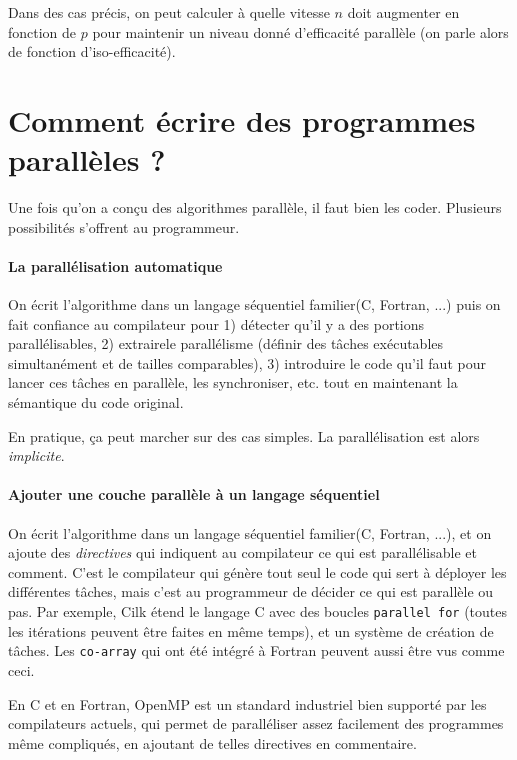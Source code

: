 Dans des cas précis, on peut calculer à quelle vitesse $n$ doit augmenter en
fonction de $p$ pour maintenir un niveau donné d'efficacité parallèle (on parle
alors de \og fonction d'iso-efficacité\fg).

\section{Comment écrire des programmes parallèles ?}

Une fois qu'on a conçu des algorithmes parallèle, il faut bien les
coder. Plusieurs possibilités s'offrent au programmeur.

\paragraph{La parallélisation automatique} On écrit l'algorithme dans un langage
séquentiel \og familier\fg (C, Fortran, ...) puis on fait confiance au
compilateur pour 1) détecter qu'il y a des portions parallélisables, 2) \og
extraire\fg le parallélisme (définir des tâches exécutables simultanément et de
tailles comparables), 3) introduire le code qu'il faut pour lancer ces tâches en
parallèle, les synchroniser, etc. tout en maintenant la sémantique du code
original.

En pratique, ça peut marcher sur des cas simples. La parallélisation est alors
\emph{implicite}.

\paragraph{Ajouter une couche parallèle à un langage séquentiel}
On écrit l'algorithme dans un langage séquentiel \og familier\fg (C, Fortran,
...), et on ajoute des \emph{directives} qui indiquent au compilateur ce qui est
parallélisable et comment. C'est le compilateur qui génère tout seul le code qui
sert à déployer les différentes tâches, mais c'est au programmeur de décider ce
qui est parallèle ou pas. Par exemple, \textsf{Cilk} étend le langage C avec des
boucles \texttt{parallel for} (toutes les itérations peuvent être faites en même
temps), et un système de création de \og tâches\fg. Les \texttt{co-array} qui
ont été intégré à Fortran peuvent aussi être vus comme ceci.

En C et en Fortran, \textsf{OpenMP} est un standard industriel bien supporté par
les compilateurs actuels, qui permet de paralléliser assez facilement des
programmes même compliqués, en ajoutant de telles directives en commentaire.

